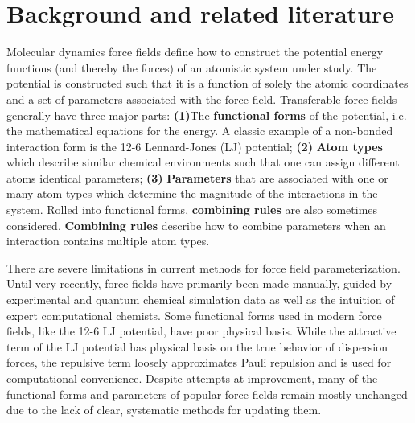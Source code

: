 \documentclass[rmp,nofootinbib,superscriptaddress,12pt,tightenlines,notitlepage]{revtex4-1}
\begin{document}
\section{Background and related literature}
Molecular dynamics force fields define how to construct the potential energy functions (and thereby the forces) 
of an atomistic system under study. The potential is constructed such that it is a function of solely the atomic 
coordinates and a set of parameters associated with the force field. Transferable force fields generally have 
three major parts: \textbf{(1)}The \textbf{functional forms} of the potential, i.e. the mathematical equations for the energy. 
A classic example of a non-bonded interaction form is the 12-6 Lennard-Jones (LJ) potential; \textbf{(2)} \textbf{Atom types} 
which describe similar chemical environments such that one can assign different atoms identical parameters; \textbf{(3)} \textbf{Parameters} 
that are associated with one or many atom types which determine the magnitude of the interactions in the system. 
Rolled into functional forms, \textbf{combining rules} are also sometimes considered. \textbf{Combining rules} describe how to combine parameters 
when an interaction contains multiple atom types.

There are severe limitations in current methods for force field parameterization. Until very 
recently, force fields have primarily been made manually, guided by experimental and quantum chemical simulation 
data as well as the intuition of expert computational chemists.\cite{charmm1,charmm2,mm2,mmff,amber} Some functional 
forms used in modern force fields, like the 12-6 LJ potential, have poor physical basis. While the attractive term 
of the LJ potential has physical basis on the true behavior of dispersion forces, the repulsive term loosely 
approximates Pauli repulsion and is used for computational convenience. Despite attempts at improvement, many of 
the functional forms and parameters of popular force fields remain mostly unchanged due to the lack of clear, 
systematic methods for updating them.\cite{unchanged}
\end{document}
